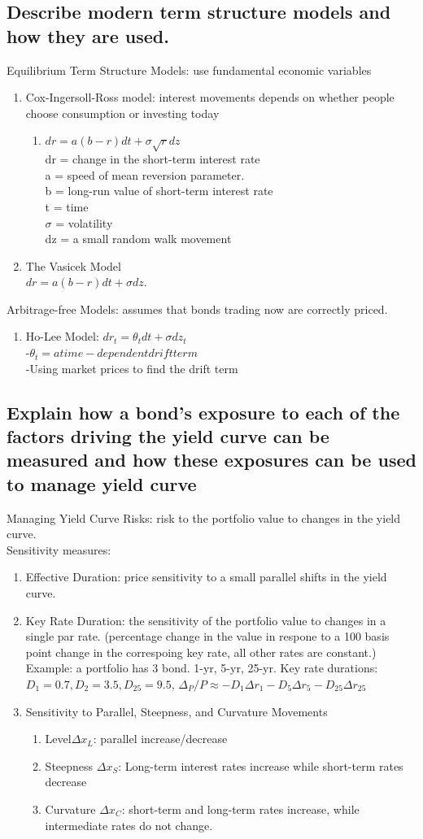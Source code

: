\documentclass{article}
\newcommand{\be}{\begin{enumerate}}
\newcommand{\ee}{\end{enumerate}}
\begin{document}
\subsection{Describe modern term structure models and how they are used.}
Equilibrium Term Structure Models: use fundamental economic variables
\be
    \item Cox-Ingersoll-Ross model: interest movements depends on whether people
        choose consumption or investing today
        \be
            \item $ dr=a(b-r)dt+\sigma\sqrt{r}dz $
                \\dr = change in the short-term interest rate
                \\a = speed of mean reversion parameter.
                \\b = long-run value of short-term interest rate
                \\t = time
                \\$\sigma$ = volatility
                \\dz = a small random walk movement
        \ee
    \item The Vasicek Model
        \\$dr = a(b-r)dt + \sigma dz$.
\ee
Arbitrage-free Models: assumes that bonds trading now are correctly priced.
\be
    \item Ho-Lee Model: $dr_t=\theta_t dt + \sigma dz_t$
        \\-$\theta_t=a time-dependent drift term$
        \\-Using market prices to find the drift term
\ee
\subsection{Explain how a bond's exposure to each of the factors driving the yield
curve can be measured and how these exposures can be used to manage yield curve}
Managing Yield Curve Risks: risk to the portfolio value to changes in the yield curve.
\\Sensitivity measures:
\be
    \item Effective Duration: price sensitivity to a small parallel shifts in the yield curve.
    \item Key Rate Duration: the sensitivity of the portfolio value to changes in a single
        par rate. (percentage change in the value in respone to a 100 basis point change
        in the correspoing key rate, all other rates are constant.)
        \\  Example: a portfolio has 3 bond. 1-yr, 5-yr, 25-yr. Key rate durations: $D_1=0.7,
        D_2=3.5,D_{25}=9.5$,
        $\Delta_P/P \approx -D_1\Delta r_1-D_5\Delta r_5 - D_{25}\Delta r_{25}$
    \item Sensitivity to Parallel, Steepness, and Curvature Movements
        \be
            \item Level$\Delta x_L$: parallel increase/decrease
            \item Steepness $\Delta x_S$: Long-term interest rates increase while short-term rates decrease
            \item Curvature $\Delta x_C$: short-term and long-term rates increase, while intermediate
                rates do not change.
        \ee
\ee
\end{document}
